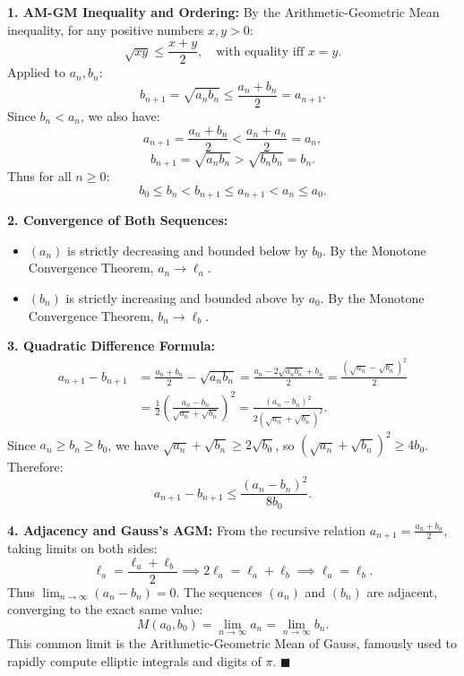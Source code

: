\begin{solution}
\textbf{1. AM-GM Inequality and Ordering:}
By the Arithmetic-Geometric Mean inequality, for any positive numbers $x, y > 0$:
\[
\sqrt{xy} \le \frac{x + y}{2}, \quad \text{with equality iff } x = y.
\]
Applied to $a_n, b_n$:
\[
b_{n+1} = \sqrt{a_n b_n} \le \frac{a_n + b_n}{2} = a_{n+1}.
\]
Since $b_n < a_n$, we also have:
\[
a_{n+1} = \frac{a_n + b_n}{2} < \frac{a_n + a_n}{2} = a_n,
\]
\[
b_{n+1} = \sqrt{a_n b_n} > \sqrt{b_n b_n} = b_n.
\]
Thus for all $n \ge 0$:
\[
b_0 \le b_n < b_{n+1} \le a_{n+1} < a_n \le a_0.
\]

\textbf{2. Convergence of Both Sequences:}
\begin{itemize}[leftmargin=1.5em,itemsep=1pt]
  \item $(a_n)$ is strictly decreasing and bounded below by $b_0$. By the Monotone Convergence Theorem, $a_n \to \ell_a$.
  \item $(b_n)$ is strictly increasing and bounded above by $a_0$. By the Monotone Convergence Theorem, $b_n \to \ell_b$.
\end{itemize}

\textbf{3. Quadratic Difference Formula:}
\begin{align*}
a_{n+1} - b_{n+1} &= \frac{a_n + b_n}{2} - \sqrt{a_n b_n} = \frac{a_n - 2\sqrt{a_n b_n} + b_n}{2} = \frac{(\sqrt{a_n} - \sqrt{b_n})^2}{2} \\
&= \frac{1}{2} \left( \frac{a_n - b_n}{\sqrt{a_n} + \sqrt{b_n}} \right)^2 = \frac{(a_n - b_n)^2}{2(\sqrt{a_n} + \sqrt{b_n})^2}.
\end{align*}
Since $a_n \ge b_n \ge b_0$, we have $\sqrt{a_n} + \sqrt{b_n} \ge 2\sqrt{b_0}$, so $(\sqrt{a_n} + \sqrt{b_n})^2 \ge 4b_0$.
Therefore:
\[
a_{n+1} - b_{n+1} \le \frac{(a_n - b_n)^2}{8b_0}.
\]

\textbf{4. Adjacency and Gauss's AGM:}
From the recursive relation $a_{n+1} = \frac{a_n + b_n}{2}$, taking limits on both sides:
\[
\ell_a = \frac{\ell_a + \ell_b}{2} \implies 2\ell_a = \ell_a + \ell_b \implies \ell_a = \ell_b.
\]
Thus $\lim_{n \to \infty} (a_n - b_n) = 0$.
The sequences $(a_n)$ and $(b_n)$ are adjacent, converging to the exact same value:
\[
M(a_0, b_0) = \lim_{n \to \infty} a_n = \lim_{n \to \infty} b_n.
\]
This common limit is the Arithmetic-Geometric Mean of Gauss, famously used to rapidly compute elliptic integrals and digits of $\pi$. \hfill $\blacksquare$
\end{solution}
